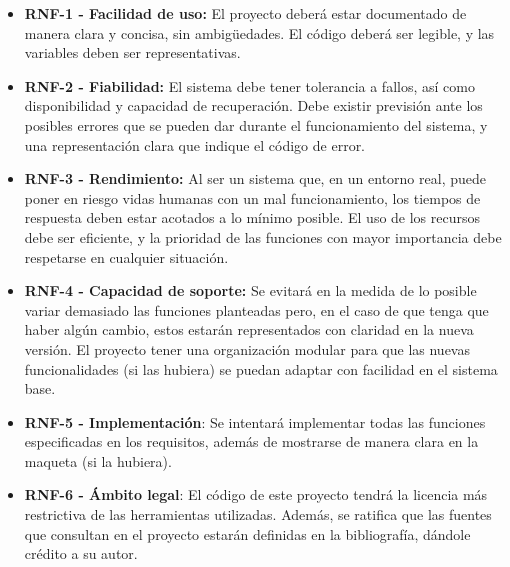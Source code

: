 \begin{itemize}
    \item \textbf{RNF-1 - Facilidad de uso:} El proyecto deberá estar documentado de manera clara y concisa, sin ambigüedades. El código deberá ser legible, y las variables deben ser representativas.
    \item \textbf{RNF-2 - Fiabilidad:} El sistema debe tener tolerancia a fallos, así como disponibilidad y capacidad de recuperación. Debe existir previsión ante los posibles errores que se pueden dar durante el funcionamiento del sistema, y una representación clara que indique el código de error.
    \item \textbf{RNF-3 - Rendimiento:} Al ser un sistema que, en un entorno real, puede poner en riesgo vidas humanas con un mal funcionamiento, los tiempos de respuesta deben estar acotados a lo mínimo posible. El uso de los recursos debe ser eficiente, y la prioridad de las funciones con mayor importancia debe respetarse en cualquier situación.
    \item \textbf{RNF-4 - Capacidad de soporte:} Se evitará en la medida de lo posible variar demasiado las funciones planteadas pero, en el caso de que tenga que haber algún cambio, estos estarán representados con claridad en la nueva versión. El proyecto tener una organización modular para que las nuevas funcionalidades (si las hubiera) se puedan adaptar con facilidad en el sistema base. 
    \item \textbf{RNF-5 - Implementación}: Se intentará implementar todas las funciones especificadas en los requisitos, además de mostrarse de manera clara en la maqueta (si la hubiera).
    \item \textbf{RNF-6 - Ámbito legal}: El código de este proyecto tendrá la licencia más restrictiva de las herramientas utilizadas. Además, se ratifica que las fuentes que consultan en el proyecto estarán definidas en la bibliografía, dándole crédito a su autor. 
\end{itemize}

